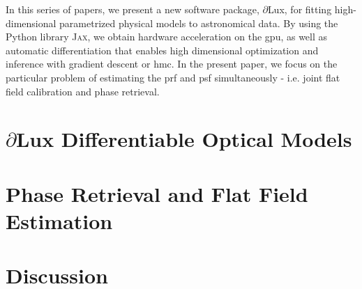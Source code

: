 \documentclass[]{spie}
\newcommand\dlux{$\partial$Lux\xspace}
\begin{document}


In this series of papers, we present a new software package, \dlux, for fitting high-dimensional parametrized physical models to astronomical data. By using the Python library \textsc{Jax}\cite{jax}, we obtain hardware acceleration on the \ac{gpu}, as well as automatic differentiation that enables high dimensional optimization and inference with gradient descent or \ac{hmc}. In the present paper, we focus on the particular problem of estimating the \ac{prf} and \ac{psf} simultaneously - i.e. joint flat field calibration and phase retrieval.


\section{\dlux Differentiable Optical Models}
\label{sec:dlux}




\section{Phase Retrieval and Flat Field Estimation}
\label{sec:phaseretrieval}





\section{Discussion}
\end{document}
